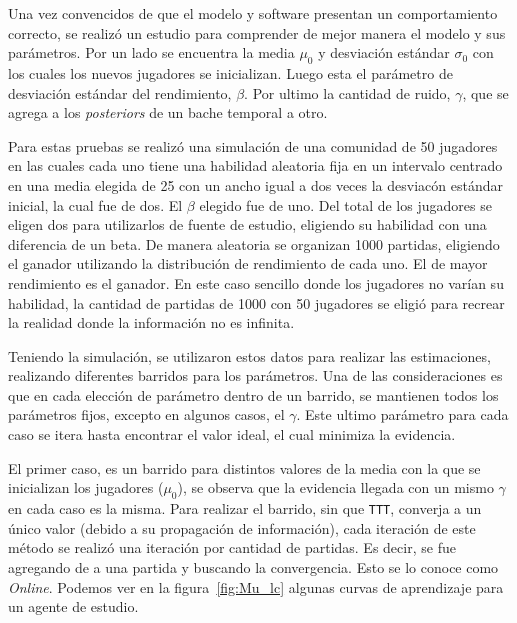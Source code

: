 \documentclass[11pt,twoside,spanish]{report} %
\begin{document}
Una vez convencidos de que el modelo y software presentan un comportamiento correcto, se realiz\'o un estudio para comprender de mejor manera el modelo y sus par\'ametros.
Por un lado se encuentra la media $\mu_0$ y desviaci\'on est\'andar $\sigma_0$ con los cuales los nuevos jugadores se inicializan.
Luego esta el par\'ametro de desviaci\'on est\'andar del rendimiento, $\beta$.
Por ultimo la cantidad de ruido, $\gamma$, que se agrega a los \textit{posteriors} de un bache temporal a otro.

Para estas pruebas se realiz\'o una simulaci\'on de una comunidad de 50 jugadores en las cuales cada uno tiene una habilidad aleatoria fija en un intervalo centrado en una media elegida de 25 con un ancho igual a dos veces la desviac\'on est\'andar inicial, la cual fue de dos.
El $\beta$ elegido fue de uno.
Del total de los jugadores se eligen dos para utilizarlos de fuente de estudio, eligiendo su habilidad con una diferencia de un beta.
De manera aleatoria se organizan 1000 partidas, eligiendo el ganador utilizando la distribuci\'on de rendimiento de cada uno.
El de mayor rendimiento es el ganador.
En este caso sencillo donde los jugadores no var\'ian su habilidad, la cantidad de partidas de 1000 con 50 jugadores se eligi\'o para recrear la realidad donde la informaci\'on no es infinita.

Teniendo la simulaci\'on, se utilizaron estos datos para realizar las estimaciones, realizando diferentes barridos para los par\'ametros.
Una de las consideraciones es que en cada elecci\'on de par\'ametro dentro de un barrido, se mantienen todos los par\'ametros fijos,  excepto en algunos casos, el $\gamma$.
Este ultimo par\'ametro para cada caso se itera hasta encontrar el valor ideal, el cual minimiza la evidencia.

El primer caso, es  un barrido para distintos valores de la media con la que se inicializan los jugadores ($\mu_0$), se observa que la evidencia llegada con un mismo $\gamma$ en cada caso es la misma. Para realizar el barrido, sin que \texttt{TTT}, converja a un \'unico valor (debido a su propagaci\'on de informaci\'on), cada iteraci\'on de este m\'etodo se realiz\'o una iteraci\'on por cantidad de partidas.
Es decir, se fue agregando de a una partida y buscando la convergencia.
Esto se lo conoce como \textit{Online}.
Podemos ver en la figura~\ref{fig:Mu_lc} algunas curvas de aprendizaje para un agente de estudio.
\end{document}

